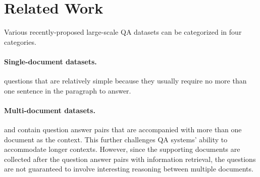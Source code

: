 \section{Related Work}
Various recently-proposed large-scale QA datasets can be categorized in four categories.

\paragraph{Single-document datasets.} \squad{} \cite{rajpurkar2016squad, rajpurkar2018know} questions that are relatively simple because they usually require no more than one sentence in the paragraph to answer.

\paragraph{Multi-document datasets.} \triviaqa{} \cite{Joshi2017TriviaQA} and \searchqa{} \cite{dunn2017searchqa} contain question answer pairs that are accompanied with more than one document as the context.
This further challenges QA systems' ability to accommodate longer contexts.
However, since the supporting documents are collected after the question answer pairs with information retrieval, the questions are not guaranteed to involve interesting reasoning between multiple documents.

